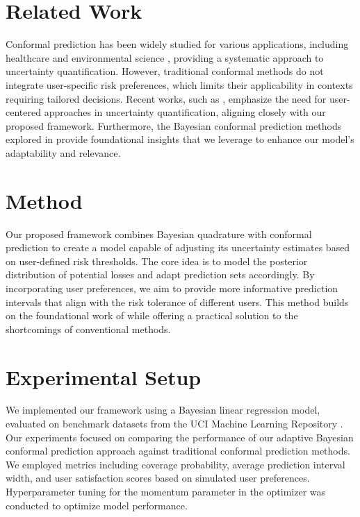 \documentclass{article} %
\theoremstyle{plain}
\theoremstyle{definition}
\theoremstyle{remark}
\begin{document}
\section{Related Work}
\label{sec:related}
Conformal prediction has been widely studied for various applications, including healthcare \cite{papangelou2024reliableml} and environmental science \cite{ghosh2023improvinguq}, providing a systematic approach to uncertainty quantification. However, traditional conformal methods do not integrate user-specific risk preferences, which limits their applicability in contexts requiring tailored decisions. Recent works, such as \cite{cortes-gomez2024utilitydirectedcp}, emphasize the need for user-centered approaches in uncertainty quantification, aligning closely with our proposed framework. Furthermore, the Bayesian conformal prediction methods explored in \cite{gibson2025bayesiancp} provide foundational insights that we leverage to enhance our model's adaptability and relevance.

\section{Method}
\label{sec:method}
Our proposed framework combines Bayesian quadrature with conformal prediction to create a model capable of adjusting its uncertainty estimates based on user-defined risk thresholds. The core idea is to model the posterior distribution of potential losses and adapt prediction sets accordingly. By incorporating user preferences, we aim to provide more informative prediction intervals that align with the risk tolerance of different users. This method builds on the foundational work of \cite{snell2025conformalpa} while offering a practical solution to the shortcomings of conventional methods.

\section{Experimental Setup}
\label{sec:experimental_setup}
We implemented our framework using a Bayesian linear regression model, evaluated on benchmark datasets from the UCI Machine Learning Repository \cite{asuncion2007uciml}. Our experiments focused on comparing the performance of our adaptive Bayesian conformal prediction approach against traditional conformal prediction methods. We employed metrics including coverage probability, average prediction interval width, and user satisfaction scores based on simulated user preferences. Hyperparameter tuning for the momentum parameter in the optimizer was conducted to optimize model performance.
\end{document}
